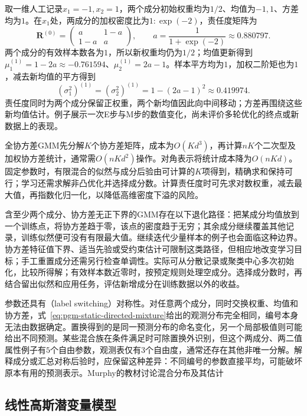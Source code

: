 \begin{example}[一轮可复核的高斯混合EM]
  \label{ex:pgm-static-directed-gmm-em}
  取一维人工记录$x_1=-1,x_2=1$，两个成分初始权重均为$1/2$、均值为$-1,1$、方差均为$1$。在$x_1$处，两成分的加权密度比为$1:\exp(-2)$，责任度矩阵为
  \[
    \bm{R}^{(0)}
      =\begin{pmatrix}a&1-a\\1-a&a\end{pmatrix},
    \qquad a=\frac{1}{1+\exp(-2)}\approx0.880797.
  \]
  两个成分的有效样本数各为$1$，所以新权重均仍为$1/2$；均值更新得到$\mu_1^{(1)}=1-2a\approx-0.761594$、$\mu_2^{(1)}=2a-1$。样本平方均为$1$，加权二阶矩也为$1$，减去新均值的平方得到
  \[
    (\sigma_1^2)^{(1)}=(\sigma_2^2)^{(1)}
      =1-(2a-1)^2\approx0.419974.
  \]
  责任度同时为两个成分保留正权重，两个新均值因此向中间移动；方差再围绕这些新均值估计。例子展示一次E步与M步的数值变化，尚未评价多轮优化的终点或新数据上的表现。
\end{example}

全协方差GMM先分解$K$个协方差矩阵，成本为$O(Kd^3)$，再计算$nK$个二次型及加权协方差统计，通常需$O(nKd^2)$操作。对角表示将统计成本降为$O(nKd)$。固定参数时，有限混合的似然与成分后验由可计算的$K$项得到，精确求和保持可行；学习还需求解非凸优化并选择成分数。计算责任度时可先求对数权重，减去最大值，再指数化归一化，以降低高维密度下溢的风险。

含至少两个成分、协方差无正下界的GMM存在以下退化路径：把某成分均值放到一个训练点，将协方差趋于零，该点的密度趋于无穷；其余成分继续覆盖其他记录，训练似然便可没有有限最大值。继续迭代少量样本的例子也会面临这种边界。协方差特征值下界、适当先验或受约束估计可限制这类路径，但相应地改变学习目标；手工重置成分还需另行检查单调性。实际可从分散记录或聚类中心多次初始化，比较所得解；有效样本数近零时，按预定规则处理空成分。选择成分数时，再结合留出似然和应用任务，评估新增成分在训练数据以外的收益。

参数还具有（label switching）对称性。对任意两个成分，同时交换权重、均值和协方差，式~\eqref{eq:pgm-static-directed-mixture}给出的观测分布完全相同，编号本身无法由数据确定。置换得到的是同一预测分布的命名变化，另一个局部极值则可能给出不同预测。某些混合族在条件满足时可除置换外识别，但这个两成分、两二值属性例子有$5$个自由参数，观测表仅有$3$个自由度，通常还存在其他非唯一分解。解释成分或汇总对称后验时，应保留这种差异：不同编号的参数直接平均，可能破坏原本有用的预测表示。Murphy的教材讨论混合分布及其估计

\subsection{线性高斯潜变量模型}
\label{sec:pgm-static-directed-linear-gaussian}

